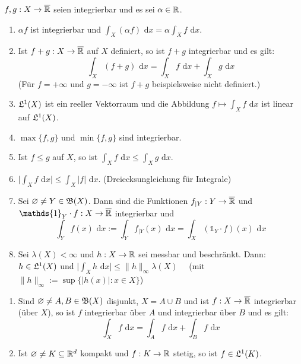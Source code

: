 \documentclass[a4paper,twoside,DIV15,BCOR12mm,chapterprefix=true,headings=onelinechapter]{scrbook}
\begin{document}
\begin{satz}
\label{Satz 4.11}
$f, g: X \to \overline{\mathbb{R}}$ seien integrierbar und es sei $\alpha \in \mathbb{R}$.
\begin{enumerate}
 \item $\alpha f$ ist integrierbar und $\int_X (\alpha f) \text{ d}x = \alpha \int_X f \text{ d}x$.
 \item Ist $f+g:X\to\overline{\mathbb{R}}$ auf $X$ definiert, so ist $f+g$ integrierbar und es gilt:
 \[\int_X (f+g)\text{ d}x = \int_X f \text{ d}x + \int_X g \text{ d}x\]
(Für $f=+\infty$ und $g=-\infty$ ist $f+g$ beispielsweise nicht definiert.)
 \item $\mathfrak{L}^1(X)$ ist ein reeller Vektorraum und die Abbildung $f \mapsto \int_X f \text{ d}x$ ist linear auf $\mathfrak{L}^1(X)$.
 \item $\max\{f,g\}$ und $\min\{f,g\}$ sind integrierbar.
 \item Ist $f\leq g$ auf $X$, so ist $\int_X f \text{ d}x \leq \int_X g \text{ d}x$.
 \item $\lvert \int_X f \text{ d}x \rvert \leq \int_X \lvert f \rvert \text{ d}x$. (Dreiecksungleichung für Integrale)
 \item Sei $\varnothing\ne Y \in \mathfrak{B}(X)$. Dann sind die Funktionen $f_{|Y}: Y \to \overline{\mathbb{R}}$ und $\mathds{1}_Y\cdot f: X \to \imdr$ integrierbar und
\[\int_Y f(x) \text{ d}x := \int_Y f_{|Y} (x) \text{ d}x = \int_X(\mathds{1}_Y \cdot f)(x) \text{ d}x\]
 \item Sei $\lambda(X) < \infty$ und $h: X \to \mathbb{R}$ sei messbar und beschr\"ankt. Dann: $h \in \mathfrak{L}^1(X)$ und $\lvert \int_X h \text{ d}x\rvert \leq \|h\|_\infty \lambda(X) \quad$ (mit $\|h\|_\infty := \sup\{|h(x)| : x\in X\}$) 
\end{enumerate}

\end{satz}

\begin{beweis}
 
\end{beweis}

\begin{satz}
\label{Folgerung 4.12}
\begin{enumerate}
 \item Sind $\varnothing\ne A,B \in \mathfrak{B}(X)$ disjunkt, $X = A \cup B$ und ist $f: X \to \overline{\mathbb{R}}$ integrierbar (über $X$), so ist $f$ integrierbar über $A$ und integrierbar über $B$ und es gilt:
 \[\int_X f \text{ d}x = \int_A f \text{ d}x + \int_B f \text{ d}x\]
 \item Ist $\varnothing \neq K \subseteq \mathbb{R}^d $ kompakt und $f:K\to\mathbb{R}$ stetig, so ist $f \in \mathfrak{L}^1(K)$.
\end{enumerate}

\end{satz}
\end{document}
